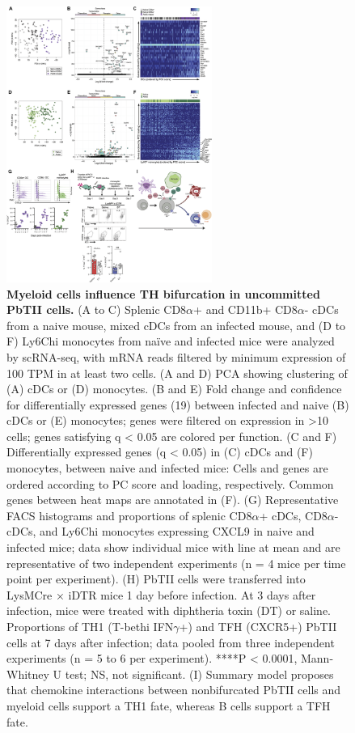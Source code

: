 \begin{figure}
    \centering
    \includegraphics[width=0.6\textwidth]{"Fig6"}
    \caption[Myeloid cells influence TH bifurcation in uncommitted PbTII cells]{\textbf{Myeloid cells influence TH bifurcation in uncommitted PbTII cells.} (A to C) Splenic CD8\( \alpha \)+ and CD11b+ CD8\( \alpha \)- cDCs from a naive mouse, mixed cDCs from an infected mouse, and (D to F) Ly6Chi monocytes from naïve and infected mice were analyzed by scRNA-seq, with mRNA reads filtered by minimum expression of 100 TPM in at least two cells. (A and D) PCA showing clustering of (A) cDCs or (D) monocytes. (B and E) Fold change and confidence for differentially expressed genes (19) between infected and naive (B) cDCs or (E) monocytes; genes were filtered on expression in >10 cells; genes satisfying q < 0.05 are colored per function. (C and F) Differentially expressed genes (q < 0.05) in (C) cDCs and (F) monocytes, between naive and infected mice: Cells and genes are ordered according to PC score and loading, respectively. Common genes between heat maps are annotated in (F). (G) Representative FACS histograms and proportions of splenic CD8\( \alpha \)+ cDCs, CD8\( \alpha \)- cDCs, and Ly6Chi monocytes expressing CXCL9 in naive and infected mice; data show individual mice with line at mean and are representative of two independent experiments (n = 4 mice per time point per experiment). (H) PbTII cells were transferred into LysMCre × iDTR mice 1 day before infection. At 3 days after infection, mice were treated with diphtheria toxin (DT) or saline. Proportions of TH1 (T-bethi IFN\( \gamma \)+) and TFH (CXCR5+) PbTII cells at 7 days after infection; data pooled from three independent experiments (n = 5 to 6 per experiment). ****P < 0.0001, Mann-Whitney U test; NS, not significant. (I) Summary model proposes that chemokine interactions between nonbifurcated PbTII cells and myeloid cells support a TH1 fate, whereas B cells support a TFH fate.}
    \label{fig:monocytes}
\end{figure}

